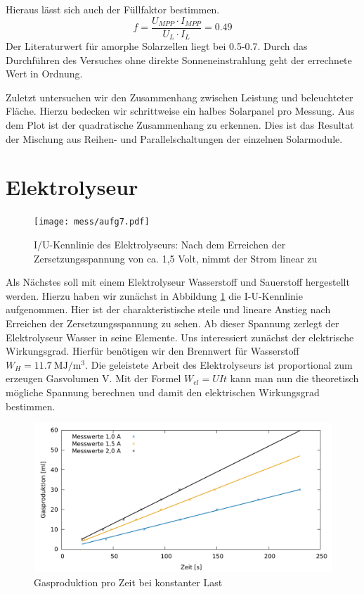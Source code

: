 Hieraus lässt sich auch der Füllfaktor bestimmen.
\[
	f= \frac{U_{MPP} \cdot I_{MPP}}{U_L \cdot I_L} = 0.49
\]
Der Literaturwert für amorphe Solarzellen liegt bei 0.5-0.7. Durch das Durchführen des Versuches ohne direkte Sonneneinstrahlung geht der errechnete Wert in Ordnung.

Zuletzt untersuchen wir den Zusammenhang zwischen Leistung und beleuchteter Fläche. Hierzu bedecken wir schrittweise ein halbes Solarpanel pro Messung. Aus dem Plot  ist der quadratische Zusammenhang zu erkennen. Dies ist das Resultat der Mischung aus Reihen- und Parallelschaltungen der einzelnen Solarmodule. 

\section{Elektrolyseur}

\begin{figure}[htbp]
	\centering
	\texttt{[image: mess/aufg7.pdf]}
	\caption{I/U-Kennlinie des Elektrolyseurs: Nach dem Erreichen der Zersetzungsspannung von ca. 1,5 Volt, nimmt der Strom linear zu}
	\label{a7}
\end{figure}

Als Nächstes soll mit einem Elektrolyseur Wasserstoff und Sauerstoff hergestellt werden. 
Hierzu haben wir zunächst in Abbildung \ref{a7} die I-U-Kennlinie aufgenommen. Hier ist der charakteristische steile und lineare Anstieg nach Erreichen der Zersetzungsspannung zu sehen. Ab dieser Spannung zerlegt der Elektrolyseur Wasser in seine Elemente.
Uns interessiert zunächst der elektrische Wirkungsgrad. Hierfür benötigen wir den Brennwert für Wasserstoff $W_H = \SI{11,7}{\mega \joule \per \metre \cubed}$. 
Die geleistete Arbeit des Elektrolyseurs ist proportional zum erzeugen Gasvolumen V. Mit der Formel $W_{el}=UIt$ kann man nun die theoretisch mögliche Spannung berechnen und damit den elektrischen Wirkungsgrad bestimmen.
\begin{figure}[htbp]
	\centering
	\includegraphics[width=1\textwidth]{mess/aufg8.pdf}
	\caption{Gasproduktion pro Zeit bei konstanter Last}
	\label{a8}
\end{figure}


